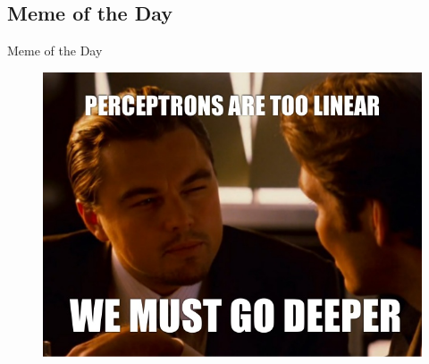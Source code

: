 \subsection{Meme of the Day}

\begin{frame}{Meme of the Day}{}
	\begin{figure}
		\includegraphics[scale=0.3]{10_deep_learning/02_img/meme_of_the_day}
	\end{figure}
\end{frame}


\makethanks

